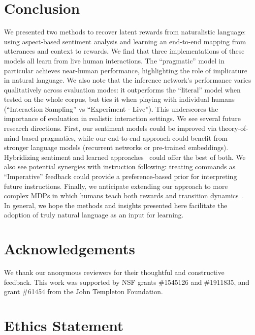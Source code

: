 \documentclass[letterpaper]{article} %
\begin{document}
\section{Conclusion}
\label{conclusion_section}
We presented two methods to recover latent rewards from naturalistic language: using aspect-based sentiment analysis and learning an end-to-end mapping from utterances and context to rewards. We find that three implementations of these models all learn from live human interactions. The ``pragmatic'' model in particular achieves near-human performance, highlighting the role of implicature in natural language. We also note that the inference network's performance varies qualitatively across evaluation modes: it outperforms the ``literal'' model when tested on the whole corpus, but ties it when playing with individual humans (``Interaction Sampling'' vs ``Experiment - Live''). This underscores the importance of evaluation in realistic interaction settings.  We see several future research directions. First, our sentiment models could be improved via theory-of-mind based pragmatics, while our end-to-end approach could benefit from stronger language models (recurrent networks or pre-trained embeddings). Hybridizing sentiment and learned approaches~\cite{jiang2011target, xu2019bertsentiment} could offer the best of both. We also see potential synergies with instruction following: treating commands as ``Imperative'' feedback could provide a preference-based prior for interpreting future instructions. Finally, we anticipate extending our approach to more complex MDPs in which humans teach both rewards and transition dynamics~\cite{narasimhan2018grounding}. In general, we hope the methods and insights presented here facilitate the adoption of truly natural language as an input for learning.



\vspace{-1.59mm}
\section*{Acknowledgements}
We thank our anonymous reviewers for their thoughtful and constructive feedback. This work was supported by NSF grants \#1545126 and \#1911835, and grant \#61454 from the John Templeton Foundation.

\section*{Ethics Statement}
\end{document}
